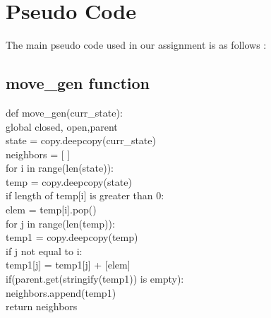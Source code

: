 \documentclass{article}
\begin{document}
\section{Pseudo Code}
The main pseudo code used in our assignment is as follows :
\subsection*{move\_gen function}
\vspace{5pt}
def move\_gen(curr\_state):
\vspace{5pt}
    \\ \hspace*{20pt}global closed, open,parent
    \vspace{2pt}
    \\ \hspace*{20pt}state = copy.deepcopy(curr\_state)
    \vspace{2pt}
    \\ \hspace*{20pt}neighbors = [ ]
    \vspace{2pt}
    \\ \hspace*{20pt}for i in range(len(state)):
    \vspace{2pt}
    \\ \hspace*{30pt}temp = copy.deepcopy(state)
    \vspace{2pt}
    \\ \hspace*{30pt}if length of temp[i] is greater than 0:
    \vspace{2pt}
    \\ \hspace*{40pt}elem = temp[i].pop()
    \vspace{2pt}
    \\ \hspace*{40pt}for j in range(len(temp)):
    \vspace{2pt}
    \\ \hspace*{50pt}temp1 = copy.deepcopy(temp)
    \vspace{2pt}
    \\ \hspace*{50pt}if j not equal to i:
    \vspace{2pt}
    \\ \hspace*{60pt}temp1[j] = temp1[j] + [elem]
    \vspace{2pt}
    \\ \hspace*{60pt}if(parent.get(stringify(temp1)) is empty):
    \vspace{2pt}
    \\ \hspace*{70pt}neighbors.append(temp1)
    \vspace{2pt}
    \\ \hspace*{20pt}return neighbors
\end{document}
